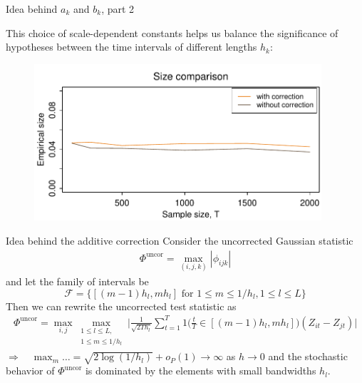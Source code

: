 \documentclass[10pt, handout]{beamer}
\begin{document}
\begin{frame}{Idea behind $a_k$ and $b_k$, part 2}

This choice of scale-dependent constants helps us balance the significance of hypotheses between the time intervals of different lengths $h_k$:

\begin{figure}
    		\centering
	\includegraphics[width=0.95\textwidth]{plots/size_with_correction}
\end{figure}


\hyperlink{frame_critval<4>}{}
\end{frame}



\begin{frame}{Idea behind the additive correction}
Consider the uncorrected Gaussian statistic
\begin{align*}
\Phi^{\text{uncor}} = \max_{(i,j,k)} |\phi_{ijk}|
\end{align*}\pause
and let the family of intervals be \[\mathcal{F} = \big\{[(m-1) h_l, m h_l] \text{ for } 1\le m \le 1/h_l, 1 \le l \le L\big\}\]\pause
Then we can rewrite the uncorrected test statistic as
\begin{align*}
\Phi^{\text{uncor}} = \max_{i, j} \max_{\substack{1 \le l \le L, \\ 1\le m \le 1/h_l}} \Big|\frac{1}{\sqrt{2 T h_l}} \sum\limits_{t=1}^T 1 \Big( \frac{t}{T} \in [(m-1) h_l, m h_l] \Big) (Z_{it} - Z_{jt})\Big|
\end{align*}\pause
$\Rightarrow \quad \max_m \ldots =\sqrt{2\log(1/h_l)} + o_P(1) \to \infty$ as $h \to 0$ and the stochastic behavior of $\Phi^{\text{uncor}}$ is dominated by the elements with small bandwidths $h_l$. \hyperlink{frame_test<4>}{}
\end{frame}
\end{document}
